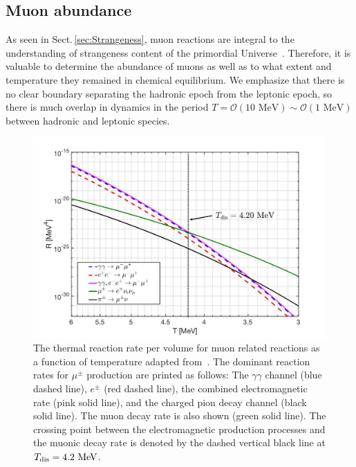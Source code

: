 \documentclass[universe,article,submit,moreauthors,pdftex,a4paper]{Definitions/mdpi}
\newcommand{\MeV}{\text{ MeV}}
\newcommand*{\rsec}[1]{Sect.\,{\ref{#1}}}
\begin{document}
\subsection{Muon abundance} \label{sec:Muons}
\noindent As seen in \rsec{sec:Strangeness}, muon reactions are integral to the understanding of strangeness content of the primordial Universe~\cite{Yang:2021bko}. Therefore, it is valuable to determine the abundance of muons as well as to what extent and temperature they remained in chemical equilibrium. We emphasize that there is no clear boundary separating the hadronic epoch from the leptonic epoch, so there is much overlap in dynamics in the period $T=\mathcal{O}(10\MeV)\sim\mathcal{O}(1\MeV)$ between hadronic and leptonic species.

\begin{figure}[h]
\centering
\includegraphics[width=0.9\columnwidth]{./plots/MuonRate_new2.jpg}
\caption{The thermal reaction rate per volume for muon related reactions as a function of temperature adapted from~\cite{Rafelski:2021aey}. The dominant reaction rates for $\mu^\pm$ production are printed as follows: The $\gamma\gamma$ channel (blue dashed line), $e^{\pm}$ (red dashed line), the combined electromagnetic rate (pink solid line), and the charged pion decay channel (black solid line). The muon decay rate is also shown (green solid line). The crossing point between the electromagnetic production processes and the muonic decay rate is denoted by the dashed vertical black line at $T_{\rm dis}=4.2\MeV$.}
\label{muon_fig} 
\end{figure}
\end{document}
